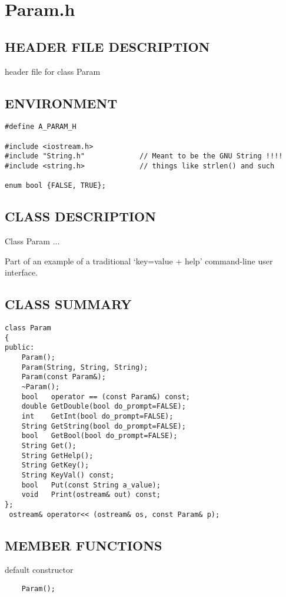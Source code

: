 \clearpage
\section{Param.h}

\subsection*{HEADER FILE DESCRIPTION}
 header file for class Param
  
\subsection*{ENVIRONMENT}
\begin{verbatim}
#define A_PARAM_H

#include <iostream.h>
#include "String.h"             // Meant to be the GNU String !!!!
#include <string.h>             // things like strlen() and such

enum bool {FALSE, TRUE};
\end{verbatim}

\subsection*{CLASS DESCRIPTION}
   Class Param ...
  
   Part of an example of a traditional `key=value + help' command-line user
   interface.
  

\subsection*{CLASS SUMMARY}
\begin{verbatim}
class Param
{
public:
    Param();
    Param(String, String, String);
    Param(const Param&);
    ~Param();
    bool   operator == (const Param&) const;
    double GetDouble(bool do_prompt=FALSE);
    int    GetInt(bool do_prompt=FALSE);
    String GetString(bool do_prompt=FALSE);
    bool   GetBool(bool do_prompt=FALSE);
    String Get();
    String GetHelp();
    String GetKey();
    String KeyVal() const;
    bool   Put(const String a_value);
    void   Print(ostream& out) const;
};
 ostream& operator<< (ostream& os, const Param& p);
\end{verbatim}

\subsection*{MEMBER FUNCTIONS}
    default constructor
\begin{verbatim}
    Param();
\end{verbatim}

